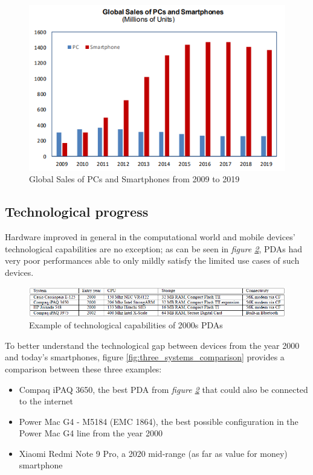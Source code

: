 \begin{figure}[!ht]
    \centering
    \includegraphics[scale=0.9]{document/chapters/chapter_1/images/global_sales_of_pcs_and_smartphones.png}
    \caption{Global Sales of PCs and Smartphones from 2009 to 2019 \cite{smartphones_sales}}
    \label{fig:global_sales_of_pcs_and_smartphones}
\end{figure}

\subsection{Technological progress}
Hardware improved in general in the computational world and mobile devices' technological capabilities are no exception; as can be seen in \textit{figure \ref{fig:pda_capabilities}}, PDAs had very poor performances able to only mildly satisfy the limited use cases of such devices. 

\begin{figure}[!ht]
    \centering
    \includegraphics[scale=0.75]{document/chapters/chapter_1/images/pda_capabilities.png}
    \caption{Example of technological capabilities of 2000s PDAs \cite{integrating_mobile_devices_into_grid}}
    \label{fig:pda_capabilities}
\end{figure}

To better understand the technological gap between devices from the year 2000 and today's smartphones, {figure \ref{fig:three_systems_comparison}} provides a comparison between these three examples:
\begin{itemize}
    \item Compaq iPAQ 3650, the best PDA from \textit{figure \ref{fig:pda_capabilities}} that could also be connected to the internet
    \item Power Mac G4 - M5184 (EMC 1864), the best possible configuration in the Power Mac G4 line from the year 2000
    \item Xiaomi Redmi Note 9 Pro, a 2020 mid-range (as far as value for money) smartphone
\end{itemize}
\vspace*{20mm}

